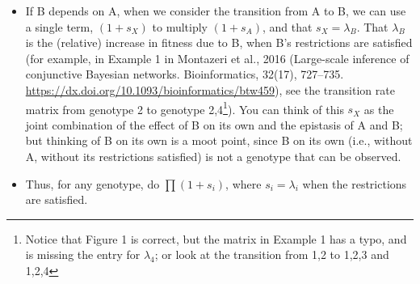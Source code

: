 \documentclass[11pt]{article}
\begin{document}
\begin{itemize}
\begin{itemize}
\item If B depends on A, when we consider the transition from A to B, we can use a single term, \((1 + s_X)\) to multiply \((1 + s_A)\), and that \(s_X = \lambda_B\). That \(\lambda_B\) is the (relative) increase in fitness due to B, when B's restrictions are satisfied (for example, in Example 1 in Montazeri et al., 2016 (Large-scale inference of conjunctive Bayesian networks. Bioinformatics, 32(17), 727–735. \url{https://dx.doi.org/10.1093/bioinformatics/btw459}), see the transition rate matrix from genotype 2 to genotype 2,4\footnote{Notice that Figure 1 is correct, but the matrix in Example 1 has a typo, and is missing the entry for \(\lambda_4\); or look at the transition from 1,2 to 1,2,3 and 1,2,4}). You can think of this \(s_X\) as the joint combination of the effect of B on its own and the epistasis of A and B; but thinking of B on its own is a moot point, since B on its own (i.e., without A, without its restrictions satisfied) is not a genotype that can be observed. 

  \item  Thus, for any genotype, do \(\prod (1 + s_i)\), where \(s_i = \lambda_i\) when the restrictions are satisfied.



  \end{itemize}

\end{itemize}
\end{document}
